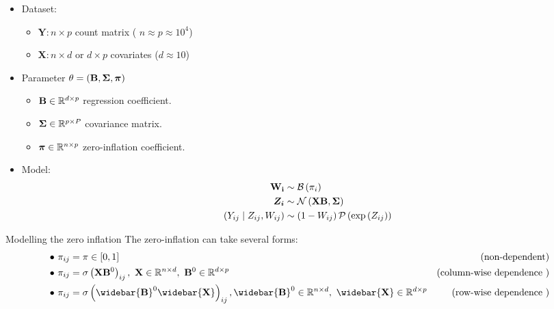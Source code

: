 \documentclass{beamer}
\theoremstyle{remark}
\begin{document}
\begin{frame}
\begin{itemize}
    \item Dataset:
    \begin{itemize}
        \item $\boldsymbol{Y}: n \times p$ count matrix ( $n \approx p \approx 10^4$)
        \item $\boldsymbol{X}: n\times d $ or $d \times p$ covariates ($d \approx 10$)
    \end{itemize}
    \item Parameter $\theta = \left(\boldsymbol{\mathbf{B}},\boldsymbol{\mathbf{\Sigma}}, \boldsymbol{\mathbf{\pi}}\right) $
    \begin{itemize}
        \item $\boldsymbol{\mathbf{B}} \in \mathbb R^{d\times p} $ regression coefficient.
        \item $\boldsymbol{\mathbf{\Sigma}} \in \mathbb R^{p\times P }$ covariance matrix.
        \item $\boldsymbol{\mathbf{\pi}} \in \mathbb R^{n\times p}$ zero-inflation coefficient.
    \end{itemize}
    \item Model:%
\begin{align*}
    \mathbf{W_{i}}  & \sim \mathbf{\mathcal{B}}\left(\pi_i\right) \\
    \boldsymbol{Z_{i}} & \sim \mathcal  N\left( \boldsymbol{\mathbf{X}} \boldsymbol{\mathbf{B}}, \boldsymbol{\mathbf{\Sigma}} \right)  \\
    \left(Y_{ij}   \mid Z_{i j}, W_{ij} \right) & \sim \left( 1- W_{ij} \right) \mathcal{P}\left(\exp \left( Z_{i j}\right)\right)
 \end{align*}
\end{itemize}
\end{frame}
\begin{frame}{Modelling the zero inflation}
    The zero-inflation can take several forms:
 \begin{subequations}
\begin{align*}
\bullet ~ \pi_{ij}  & = \pi \in [0,1]& \text{(non-dependent)}  \\
 \bullet ~ \pi_{ij} & = \sigma\left( \mathbf X\mathbf B^0\right)_{ij}, ~ \mathbf X \in \mathbb R^{n \times d}, ~ \mathbf B^0 \in \mathbb R^{d\times p} &  \text{(column-wise dependence )} \\
\bullet ~ \pi_{ij} & = \sigma\left(\widebar{\mathbf{B}}^0 \widebar{\mathbf{X}}\right)_{ij},  \widebar{\mathbf{B}}^0 \in \mathbb R^{n \times d}, ~ \widebar{\mathbf X} \in \mathbb R^{d\times p}& \text{(row-wise dependence )}
\end{align*}
\end{subequations}
\end{frame}
\end{document}
